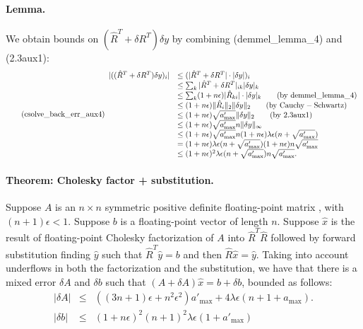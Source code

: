 \documentclass[a4paper]{article}
\begin{document}
\paragraph*{Lemma.} We obtain bounds on $(\hat{R}^T + \delta R^T) \delta y$ by
combining (demmel\_lemma\_4) and (2.3aux1):
\begin{equation}\tag{csolve\_back\_err\_aux4}
\begin{array}{rl}
|((\hat{R}^T + \delta R^T) \delta y)_i| & \le (|\hat{R}^T + \delta R^T| \cdot |\delta y|)_i \\
& \le \sum_k |\hat{R}^T + \delta R^T|_{ik} |\delta y|_k \\
& \le \sum_k (1+n\epsilon)|\hat{R}_{ki}| \cdot |\delta y|_k \qquad \mathrm{(by~demmel\_lemma\_4)} \\
& \le (1+n\epsilon) \lVert \hat{R}_i \rVert_2 \lVert \delta y \rVert_2 \qquad \mathrm{(by~Cauchy-Schwartz)} \\
& \le (1+n\epsilon) \sqrt{a'_\mathrm{max}} \lVert \delta y \rVert_2 \qquad \mathrm{(by~2.3aux1)} \\
& \le (1+n\epsilon) \sqrt{a'_\mathrm{max}} n \lVert \delta y \rVert_\infty \\
& \le (1+n\epsilon) \sqrt{a'_\mathrm{max}} n (1+n\epsilon) \lambda \epsilon (n + \sqrt{a'_\mathrm{max}}) \\
& = (1+n\epsilon)\lambda \epsilon (n + \sqrt{a'_\mathrm{max}}) (1+n\epsilon)n\sqrt{a'_\mathrm{max}} \\
& \le (1+n\epsilon)^2\lambda \epsilon (n + \sqrt{a'_\mathrm{max}}) n\sqrt{a'_\mathrm{max}}.
\end{array}
\end{equation}


\paragraph*{Theorem: Cholesky factor + substitution.}
Suppose $A$ is an $n\times n$ symmetric positive definite floating-point matrix
, with $(n+1)\epsilon < 1$.
Suppose $b$ is a floating-point vector of length $n$.
Suppose $\hat{x}$ is the result of floating-point Cholesky factorization of
$A$ into $\hat{R}^T\hat{R}$ followed by forward substitution finding $\hat{y}$ such
that $\hat{R}^T \hat{y}=b$ and then $\hat{R}\hat{x}=\hat{y}$.
Taking into account underflows in both the factorization and the substitution, we have
that there is a mixed error $\delta A$ and $\delta b$ such that
$(A+\delta A)\hat{x}=b+\delta b$, bounded as follows:
\begin{equation}\tag{csolve\_back\_err}
\begin{array}{rcl}
|\delta A| & \le & ((3n+1)\epsilon+n^2\epsilon^2)a'_\mathrm{max}+4 \lambda\epsilon (n+1+a_\mathrm{max}). \\
|\delta b| & \le & (1+n\epsilon)^2 (n+1)^2 \lambda \epsilon (1 + a'_\mathrm{max})
\end{array}
\end{equation}
\end{document}
